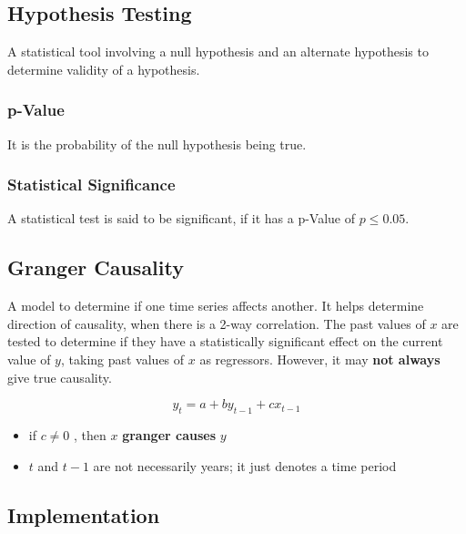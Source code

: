 \documentclass[
  english,
  doc,floatsintext]{apa6}
\providecommand{\tightlist}{%
  \setlength{\itemsep}{0pt}\setlength{\parskip}{0pt}}
\begin{document}
\hypertarget{hypothesis-testing}{%
\subsection{Hypothesis Testing}\label{hypothesis-testing}}

A statistical tool involving a null hypothesis and an alternate hypothesis to determine validity of a hypothesis.

\hypertarget{p-value}{%
\subsubsection{p-Value}\label{p-value}}

It is the probability of the null hypothesis being true.

\hypertarget{statistical-significance}{%
\subsubsection{Statistical Significance}\label{statistical-significance}}

A statistical test is said to be significant, if it has a p-Value of \(p \le 0.05\).

\hypertarget{granger-causality}{%
\subsection{Granger Causality}\label{granger-causality}}

A model to determine if one time series affects another. It helps determine direction of causality, when there is a 2-way correlation. The past values of \(x\) are tested to determine if they have a statistically significant effect on the current value of \(y\), taking past values of \(x\) as regressors. However, it may \textbf{not always} give true causality.

\[
y_t = a + b y_{t-1} + c x_{t-1}
\]

\begin{itemize}
\tightlist
\item
  if \(c \ne 0\) , then \(x\) \textbf{granger causes} \(y\)
\item
  \(t\) and \(t-1\) are not necessarily years; it just denotes a time period
\end{itemize}

\hypertarget{implementation}{%
\subsection{Implementation}\label{implementation}}
\end{document}

